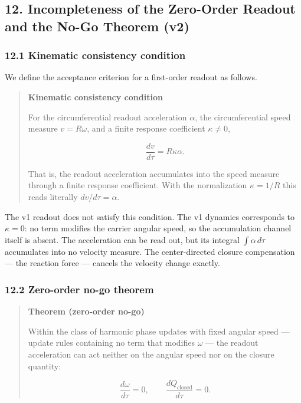 \documentclass[
  a4paper,
]{article}
\begin{document}
\subsection{12. Incompleteness of the Zero-Order Readout and the No-Go
Theorem
(v2)}\label{incompleteness-of-the-zero-order-readout-and-the-no-go-theorem-v2}

\subsubsection{12.1 Kinematic consistency
condition}\label{kinematic-consistency-condition}

We define the acceptance criterion for a first-order readout as follows.

\begin{quote}
\textbf{Kinematic consistency condition}

For the circumferential readout acceleration \(\alpha\), the
circumferential speed measure \(v=R\omega\), and a finite response
coefficient \(\kappa\ne0\),

\[
\frac{dv}{d\tau}=R\kappa\alpha.
\]

That is, the readout acceleration accumulates into the speed measure
through a finite response coefficient. With the normalization
\(\kappa=1/R\) this reads literally \(dv/d\tau=\alpha\).
\end{quote}

The v1 readout does not satisfy this condition. The v1 dynamics
corresponds to \(\kappa=0\): no term modifies the carrier angular speed,
so the accumulation channel itself is absent. The acceleration can be
read out, but its integral \(\int\alpha\,d\tau\) accumulates into no
velocity measure. The center-directed closure compensation --- the
reaction force --- cancels the velocity change exactly.

\subsubsection{12.2 Zero-order no-go
theorem}\label{zero-order-no-go-theorem}

\begin{quote}
\textbf{Theorem (zero-order no-go)}

Within the class of harmonic phase updates with fixed angular speed ---
update rules containing no term that modifies \(\omega\) --- the readout
acceleration can act neither on the angular speed nor on the closure
quantity:

\[
\frac{d\omega}{d\tau}=0,
\qquad
\frac{dQ_{\mathrm{closed}}}{d\tau}=0.
\]
\end{quote}
\end{document}
